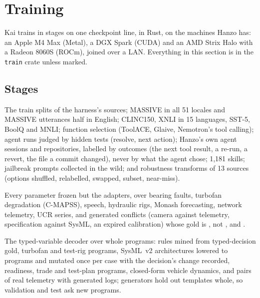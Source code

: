 \section{Training}
\label{sec:training}

Kai trains in stages on one checkpoint line, in Rust, on the machines Hanzo
has: an Apple M4 Max (Metal), a DGX Spark (CUDA) and an AMD Strix Halo with a
Radeon 8060S (ROCm), joined over a LAN. Everything in this section is in the
\texttt{train} crate \shipped{} unless marked.

\subsection{Stages}
\label{sec:stages}

\begin{description}[leftmargin=1.5em,style=nextline]
  \item[A, text decisions.] The train splits of the harness's sources; MASSIVE
    in all 51 locales and MASSIVE utterances half in English; CLINC150, XNLI in
    15 languages, SST-5, BoolQ and MNLI; function selection (ToolACE, Glaive,
    Nemotron's tool calling); agent runs judged by hidden tests (resolve, next
    action); Hanzo's own agent sessions and repositories, labelled by outcomes
    (the next tool result, a re-run, a revert, the file a commit changed), never
    by what the agent chose; 1{,}181 skills; jailbreak prompts collected in the
    wild; and robustness transforms of 13 sources (options shuffled, relabelled,
    swapped, subset, near-miss).
  \item[B, evidence.] Every parameter frozen but the adapters, over bearing
    faults, turbofan degradation (C-MAPSS), speech, hydraulic rigs, Monash
    forecasting, network telemetry, UCR series, and generated conflicts
    (camera against telemetry, specification against SysML, an expired
    calibration) whose gold is , not
    , and .
  \item[C, programs.] The typed-variable decoder over whole programs: rules
    mined from typed-decision gold, turbofan and test-rig programs, SysML~v2
    architectures lowered to programs and mutated once per case with the
    decision's change recorded, readiness, trade and test-plan programs,
    closed-form vehicle dynamics, and pairs of real telemetry with generated
    logs; generators hold out templates whole, so validation and test ask new
    programs.
\end{description}

